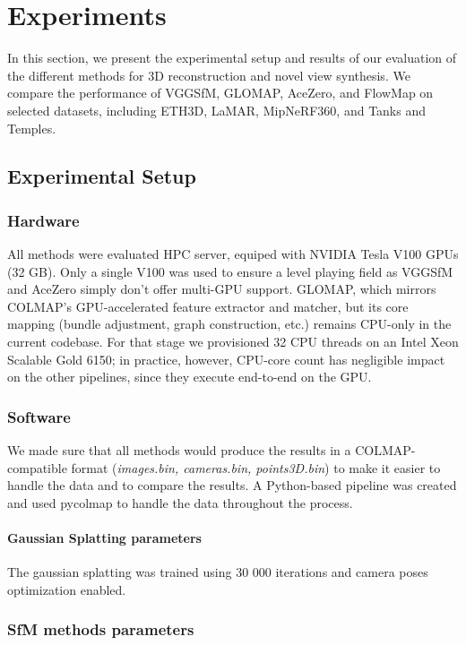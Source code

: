 \chapter{Experiments}\label{chap:experiments}

In this section, we present the experimental setup and results of our evaluation of the different methods for 3D reconstruction and novel view synthesis. 
We compare the performance of VGGSfM, GLOMAP, AceZero, and FlowMap on selected datasets, including ETH3D, LaMAR, MipNeRF360, and Tanks and Temples.

\section{Experimental Setup}\label{sec:experimental-setup}
\subsection{Hardware}
All methods were evaluated HPC server, equiped with NVIDIA Tesla V100 GPUs (32 GB). Only a single V100 was used to ensure a level playing field as VGGSfM and AceZero simply don't offer multi-GPU support.
GLOMAP, which mirrors COLMAP's GPU-accelerated feature extractor and matcher, but its core mapping (bundle adjustment, graph construction, etc.) remains CPU-only in the current codebase. 
For that stage we provisioned 32 CPU threads on an Intel Xeon Scalable Gold 6150; in practice, however, CPU-core count has negligible impact on the other pipelines, since they execute end-to-end on the GPU.

\subsection{Software}
We made sure that all methods would produce the results in a COLMAP-compatible format (\textit{images.bin, cameras.bin, points3D.bin}) to make it easier to handle the data and to compare the results.
A Python-based pipeline was created and used pycolmap to handle the data throughout the process.

\subsubsection{Gaussian Splatting parameters}
The gaussian splatting was trained using 30 000 iterations and camera poses optimization enabled.

\subsection{SfM methods parameters}
